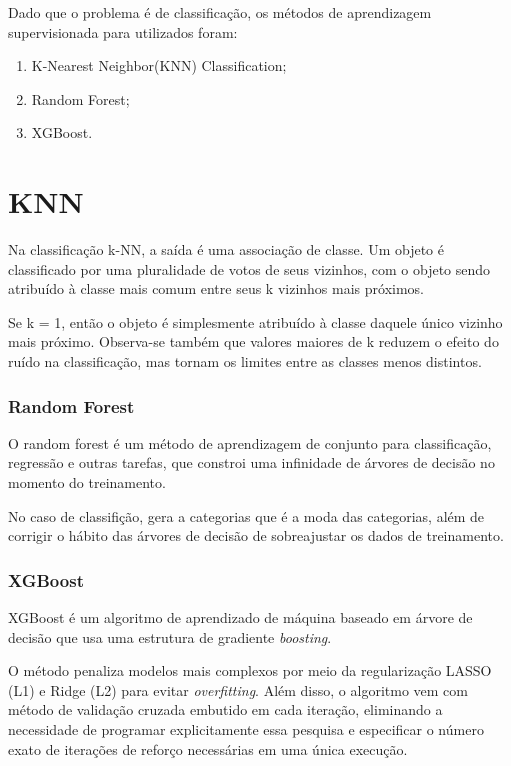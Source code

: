 \documentclass[
  12pt,
]{report}
\providecommand{\tightlist}{%
  \setlength{\itemsep}{0pt}\setlength{\parskip}{0pt}}
\begin{document}
Dado que o problema é de classificação, os métodos de aprendizagem supervisionada para utilizados foram:

\begin{enumerate}
\def\labelenumi{\arabic{enumi}.}
\tightlist
\item
  K-Nearest Neighbor(KNN) Classification;
\item
  Random Forest;
\item
  XGBoost.
\end{enumerate}

\hypertarget{knn}{%
\chapter{KNN}\label{knn}}

Na classificação k-NN, a saída é uma associação de classe. Um objeto é classificado por uma pluralidade de votos de seus vizinhos, com o objeto sendo atribuído à classe mais comum entre seus k vizinhos mais próximos.

Se k = 1, então o objeto é simplesmente atribuído à classe daquele único vizinho mais próximo. Observa-se também que valores maiores de k reduzem o efeito do ruído na classificação, mas tornam os limites entre as classes menos distintos.

\hypertarget{random-forest}{%
\subsection{Random Forest}\label{random-forest}}

O random forest é um método de aprendizagem de conjunto para classificação, regressão e outras tarefas, que constroi uma infinidade de árvores de decisão no momento do treinamento.

No caso de classifição, gera a categorias que é a moda das categorias, além de corrigir o hábito das árvores de decisão de sobreajustar os dados de treinamento.

\hypertarget{xgboost}{%
\subsection{XGBoost}\label{xgboost}}

XGBoost é um algoritmo de aprendizado de máquina baseado em árvore de decisão que usa uma estrutura de gradiente \emph{boosting}.

O método penaliza modelos mais complexos por meio da regularização LASSO (L1) e Ridge (L2) para evitar \emph{overfitting}. Além disso, o algoritmo vem com método de validação cruzada embutido em cada iteração, eliminando a necessidade de programar explicitamente essa pesquisa e especificar o número exato de iterações de reforço necessárias em uma única execução.
\end{document}
